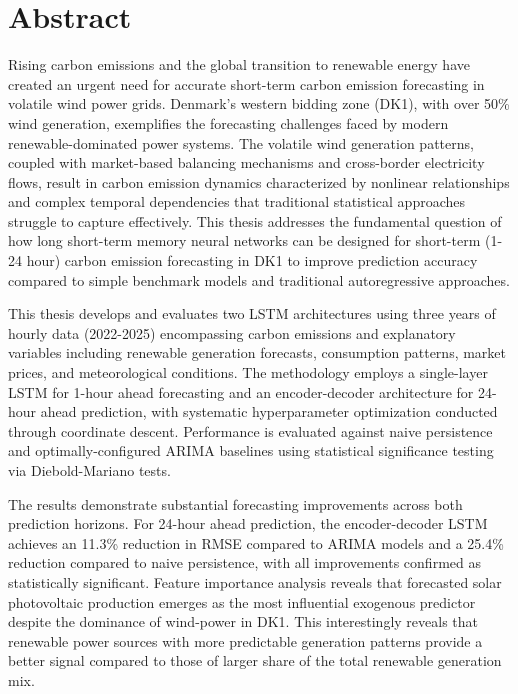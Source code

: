 \thispagestyle{plain}
\section*{Abstract}

Rising carbon emissions and the global transition to renewable energy have created an urgent need for accurate short-term carbon emission forecasting in volatile wind power grids. Denmark's western bidding zone (DK1), with over 50\% wind generation, exemplifies the forecasting challenges faced by modern renewable-dominated power systems. The volatile wind generation patterns, coupled with market-based balancing mechanisms and cross-border electricity flows, result in carbon emission dynamics characterized by nonlinear relationships and complex temporal dependencies that traditional statistical approaches struggle to capture effectively. This thesis addresses the fundamental question of how long short-term memory neural networks can be designed for short-term (1-24 hour) carbon emission forecasting in DK1 to improve prediction accuracy compared to simple benchmark models and traditional autoregressive approaches.

This thesis develops and evaluates two LSTM architectures using three years of hourly data (2022-2025) encompassing carbon emissions and explanatory variables including renewable generation forecasts, consumption patterns, market prices, and meteorological conditions. The methodology employs a single-layer LSTM for 1-hour ahead forecasting and an encoder-decoder architecture for 24-hour ahead prediction, with systematic hyperparameter optimization conducted through coordinate descent. Performance is evaluated against naive persistence and optimally-configured ARIMA baselines using statistical significance testing via Diebold-Mariano tests.

The results demonstrate substantial forecasting improvements across both prediction horizons. For 24-hour ahead prediction, the encoder-decoder LSTM achieves an 11.3\% reduction in RMSE compared to ARIMA models and a 25.4\% reduction compared to naive persistence, with all improvements confirmed as statistically significant. Feature importance analysis reveals that forecasted solar photovoltaic production emerges as the most influential exogenous predictor despite the dominance of wind-power in DK1. This interestingly reveals that renewable power sources with more predictable generation patterns provide a better signal compared to those of larger share of the total renewable generation mix.


